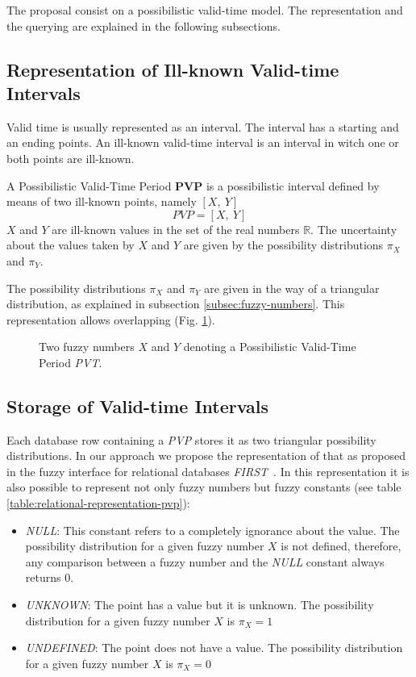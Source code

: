 The proposal consist on a possibilistic valid-time model. The representation and the querying are explained in the following subsections.

\subsection{Representation of Ill-known Valid-time Intervals}
\label{subsec:representation-ill-known}
Valid time is usually represented as an interval. The interval has a starting and an ending points. An ill-known valid-time interval is an interval in witch one or both points are ill-known. 

\begin{definition}
A Possibilistic Valid-Time Period \textbf{PVP} is a possibilistic interval defined by means of two ill-known points, namely $\left[ X,\ Y \right]$
\begin{equation}
PVP = \left[X,\ Y \right] 
\end{equation}
$X$ and $Y$ are ill-known values in the set of the real numbers $\mathbb{R}$. The uncertainty about the values taken by $X$ and $Y$ are given by the possibility distributions $\pi_X$ and $\pi_Y$.
\end{definition}

The possibility distributions $\pi_X$ and $\pi_Y$ are given in the way of a triangular distribution, as explained in subsection \ref{subsec:fuzzy-numbers}. This representation allows overlapping (Fig. \ref{fig:pvp}).


\begin{figure}[h!]
  \centering
  \caption{Two fuzzy numbers $X$ and $Y$ denoting a Possibilistic Valid-Time Period \emph{PVT}.}
  \label{fig:pvp}
\end{figure}

\subsection{Storage of Valid-time Intervals}
\label{subsec:storage}
Each database row containing a \emph{PVP} stores it as two triangular possibility distributions. In our approach we propose the representation of that as proposed in the  fuzzy interface for relational databases \emph{FIRST}~\cite{Medina94gefred.a,Gal98}. In this representation it is also possible to represent not only fuzzy numbers but fuzzy constants (see table \ref{table:relational-representation-pvp}):

\begin{itemize}
\item
\emph{NULL}: This constant refers to a completely ignorance about the value. The possibility distribution for a given fuzzy number $X$ is not defined, therefore, any comparison between a fuzzy number and the \emph{NULL} constant always returns $0$.
\item
\emph{UNKNOWN}: The point has a value but it is unknown. The possibility distribution for a given fuzzy number $X$ is $\pi_X=1$
\item
\emph{UNDEFINED}: The point does not have a value. The possibility distribution for a given fuzzy number $X$ is $\pi_X=0$
\end{itemize}


